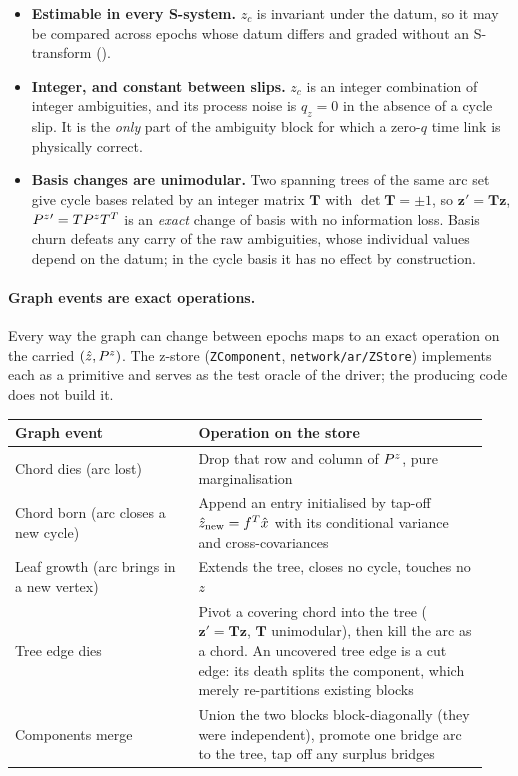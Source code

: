 \documentclass[main.tex]{subfiles}
\begin{document}
\begin{itemize}[leftmargin=*, itemsep=1pt]
\item \textbf{Estimable in every S-system.}  $z_c$ is invariant under
      the datum, so it may be compared across epochs whose datum
      differs and graded without an S-transform
      ().
\item \textbf{Integer, and constant between slips.}  $z_c$ is an
      integer combination of integer ambiguities, and its process noise
      is $q_z = 0$ in the absence of a cycle slip.  It is the \emph{only}
      part of the ambiguity block for which a zero-$q$ time link is
      physically correct.
\item \textbf{Basis changes are unimodular.}  Two spanning trees of the
      same arc set give cycle bases related by an integer matrix
      $\bm{T}$ with $\det\bm{T} = \pm1$, so $\bm{z}' = \bm{T}\bm{z}$,
      $P^{z}{}' = TP^{z}T^{T}$ is an \emph{exact} change of
      basis with no information loss.  Basis churn defeats any carry of
      the raw ambiguities, whose individual values depend on the datum;
      in the cycle basis it has no effect by construction.
\end{itemize}

\paragraph{Graph events are exact operations.}
Every way the graph can change between epochs maps to an exact
operation on the carried $(\hat{z}, P^{z})$.  The z-store
(\texttt{ZComponent}, \texttt{network/ar/ZStore}) implements each as a
primitive and serves as the test oracle of the driver; the producing
code does not build it.


\begin{center}\small
\begin{tabular}{@{}p{0.36\linewidth}p{0.58\linewidth}@{}}
\toprule
Graph event & Operation on the store \\
\midrule
Chord dies (arc lost) &
  Drop that row and column of $P^{z}$, pure marginalisation \\
Chord born (arc closes a new cycle) &
  Append an entry initialised by tap-off
  $\hat z_{\text{new}} = f^{T}\hat{x}$ with its conditional
  variance and cross-covariances \\
Leaf growth (arc brings in a new vertex) &
  Extends the tree, closes no cycle, touches no $z$ \\
Tree edge dies &
  Pivot a covering chord into the tree
  ($\bm{z}'=\bm{T}\bm{z}$, $\bm{T}$ unimodular), then kill the arc as a
  chord.  An uncovered tree edge is a cut edge: its death splits the
  component, which merely re-partitions existing blocks \\
Components merge &
  Union the two blocks block-diagonally (they were independent),
  promote one bridge arc to the tree, tap off any surplus bridges \\
\bottomrule
\end{tabular}
\end{center}
\end{document}
